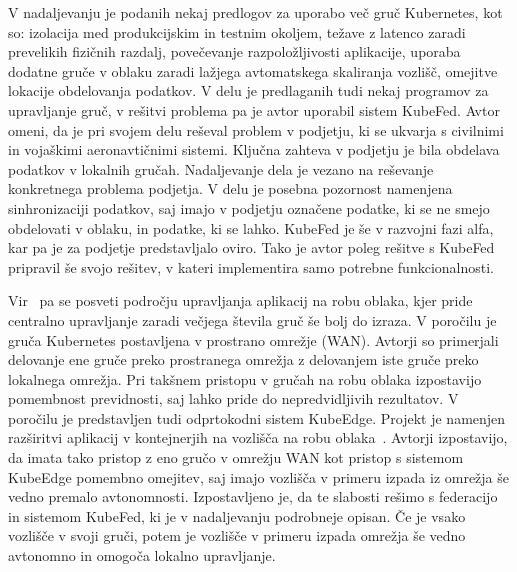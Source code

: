 \documentclass[a4paper, 12pt]{book}
\begin{document}
V nadaljevanju je podanih nekaj predlogov za uporabo več gruč Kubernetes, kot so: izolacija med produkcijskim in testnim okoljem, težave z latenco zaradi prevelikih fizičnih razdalj, povečevanje razpoložljivosti aplikacije, uporaba dodatne gruče v oblaku zaradi lažjega avtomatskega skaliranja vozlišč, omejitve lokacije obdelovanja podatkov.
V delu je predlaganih tudi nekaj programov za upravljanje gruč, v rešitvi problema pa je avtor uporabil sistem KubeFed.
Avtor omeni, da je pri svojem delu reševal problem v podjetju, ki se ukvarja s civilnimi in vojaškimi aeronavtičnimi sistemi.
Ključna zahteva v podjetju je bila obdelava podatkov v lokalnih gručah.
Nadaljevanje dela je vezano na reševanje konkretnega problema podjetja.
V delu je posebna pozornost namenjena sinhronizaciji podatkov, saj imajo v podjetju označene podatke, ki se ne smejo obdelovati v oblaku, in podatke, ki se lahko.
KubeFed je še v razvojni fazi alfa, kar pa je za podjetje predstavljalo oviro.
Tako je avtor poleg rešitve s KubeFed pripravil še svojo rešitev, v kateri implementira samo potrebne funkcionalnosti.

Vir~\cite{kube-and-edge} pa se posveti področju upravljanja aplikacij na robu oblaka, kjer pride centralno upravljanje zaradi večjega števila gruč še bolj do izraza.
V poročilu je gruča Kubernetes postavljena v prostrano omrežje (WAN).
Avtorji so primerjali delovanje ene gruče preko prostranega omrežja z delovanjem iste gruče preko lokalnega omrežja.
Pri takšnem pristopu v gručah na robu oblaka izpostavijo pomembnost previdnosti, saj lahko pride do nepredvidljivih rezultatov.
V poročilu je predstavljen tudi odprtokodni sistem KubeEdge.
Projekt je namenjen razširitvi aplikacij v kontejnerjih na vozlišča na robu oblaka~\cite{kubeedge}.
Avtorji izpostavijo, da imata tako pristop z eno gručo v omrežju WAN kot pristop s sistemom KubeEdge pomembno omejitev, saj imajo vozlišča v primeru izpada iz omrežja še vedno premalo avtonomnosti.
Izpostavljeno je, da te slabosti rešimo s federacijo in sistemom KubeFed, ki je v nadaljevanju podrobneje opisan.
Če je vsako vozlišče v svoji gruči, potem je vozlišče v primeru izpada omrežja še vedno avtonomno in omogoča lokalno upravljanje.
\end{document}
